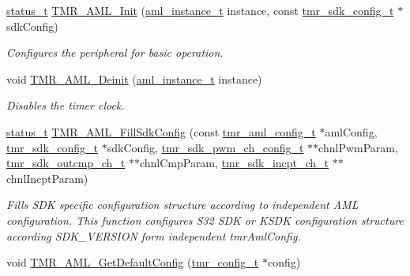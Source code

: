 \begin{DoxyCompactItemize}
\mbox{\hyperlink{group__ksdk__common_gaaabdaf7ee58ca7269bd4bf24efcde092}{status\+\_\+t}} \mbox{\hyperlink{group__function__group_gacd35322aa62b00c8389236ab1c28de3b}{T\+M\+R\+\_\+\+A\+M\+L\+\_\+\+Init}} (\mbox{\hyperlink{common__aml_8h_a562bd37c7d07adcedec5993bc0cd96e5}{aml\+\_\+instance\+\_\+t}} instance, const \mbox{\hyperlink{structtmr__sdk__config__t}{tmr\+\_\+sdk\+\_\+config\+\_\+t}} $\ast$sdk\+Config)
\begin{DoxyCompactList}\small\item\em Configures the peripheral for basic operation. \end{DoxyCompactList}\item 
void \mbox{\hyperlink{group__function__group_gadd9f3c64bdb236775e67c2226527f20c}{T\+M\+R\+\_\+\+A\+M\+L\+\_\+\+Deinit}} (\mbox{\hyperlink{common__aml_8h_a562bd37c7d07adcedec5993bc0cd96e5}{aml\+\_\+instance\+\_\+t}} instance)
\begin{DoxyCompactList}\small\item\em Disables the timer clock. \end{DoxyCompactList}\item 
\mbox{\hyperlink{group__ksdk__common_gaaabdaf7ee58ca7269bd4bf24efcde092}{status\+\_\+t}} \mbox{\hyperlink{group__function__group_ga519c237aa1084801bf11b68d5a7478f2}{T\+M\+R\+\_\+\+A\+M\+L\+\_\+\+Fill\+Sdk\+Config}} (const \mbox{\hyperlink{structtmr__aml__config__t}{tmr\+\_\+aml\+\_\+config\+\_\+t}} $\ast$aml\+Config, \mbox{\hyperlink{structtmr__sdk__config__t}{tmr\+\_\+sdk\+\_\+config\+\_\+t}} $\ast$sdk\+Config, \mbox{\hyperlink{group__struct__group_ga2b5f2d9df9d1e36f051fe92e6c6f1905}{tmr\+\_\+sdk\+\_\+pwm\+\_\+ch\+\_\+config\+\_\+t}} $\ast$$\ast$chnl\+Pwm\+Param, \mbox{\hyperlink{structtmr__sdk__outcmp__ch__t}{tmr\+\_\+sdk\+\_\+outcmp\+\_\+ch\+\_\+t}} $\ast$$\ast$chnl\+Cmp\+Param, \mbox{\hyperlink{structtmr__sdk__incpt__ch__t}{tmr\+\_\+sdk\+\_\+incpt\+\_\+ch\+\_\+t}} $\ast$$\ast$chnl\+Incpt\+Param)
\begin{DoxyCompactList}\small\item\em Fills S\+DK specific configuration structure according to independent A\+ML configuration. This function configures S32 S\+DK or K\+S\+DK configuration structure according S\+D\+K\+\_\+\+V\+E\+R\+S\+I\+ON form independent tmr\+Aml\+Config. \end{DoxyCompactList}\item 
void \mbox{\hyperlink{group__function__group_gaa3cc8cb5f7c82ecd755b6f274f6cd39c}{T\+M\+R\+\_\+\+A\+M\+L\+\_\+\+Get\+Default\+Config}} (\mbox{\hyperlink{group__struct__group_gaf1f378b0bcc8ef613858b973521fc013}{tmr\+\_\+config\+\_\+t}} $\ast$config)
$$
\end{DoxyCompactItemize}
